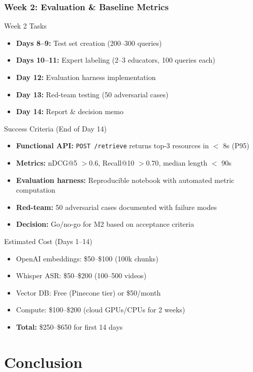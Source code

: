 \documentclass[aspectratio=169]{beamer}
\begin{document}
\begin{frame}
\frametitle{Week 2: Evaluation \& Baseline Metrics}
\begin{block}{Week 2 Tasks}
\begin{itemize}
\item \textbf{Days 8--9:} Test set creation (200--300 queries)
\item \textbf{Days 10--11:} Expert labeling (2--3 educators, 100 queries each)
\item \textbf{Day 12:} Evaluation harness implementation
\item \textbf{Day 13:} Red-team testing (50 adversarial cases)
\item \textbf{Day 14:} Report \& decision memo
\end{itemize}
\end{block}

\begin{block}{Success Criteria (End of Day 14)}
\begin{itemize}
\item \textbf{Functional API:} \texttt{POST /retrieve} returns top-3 resources in $<$ 8s (P95)
\item \textbf{Metrics:} nDCG@5 $> 0.6$, Recall@10 $> 0.70$, median length $<$ 90s
\item \textbf{Evaluation harness:} Reproducible notebook with automated metric computation
\item \textbf{Red-team:} 50 adversarial cases documented with failure modes
\item \textbf{Decision:} Go/no-go for M2 based on acceptance criteria
\end{itemize}
\end{block}

\begin{block}{Estimated Cost (Days 1--14)}
\begin{itemize}
\item OpenAI embeddings: \$50--\$100 (100k chunks)
\item Whisper ASR: \$50--\$200 (100--500 videos)
\item Vector DB: Free (Pinecone tier) or \$50/month
\item Compute: \$100--\$200 (cloud GPUs/CPUs for 2 weeks)
\item \textbf{Total:} \$250--\$650 for first 14 days
\end{itemize}
\end{block}
\end{frame}

\section{Conclusion}
\end{document}
